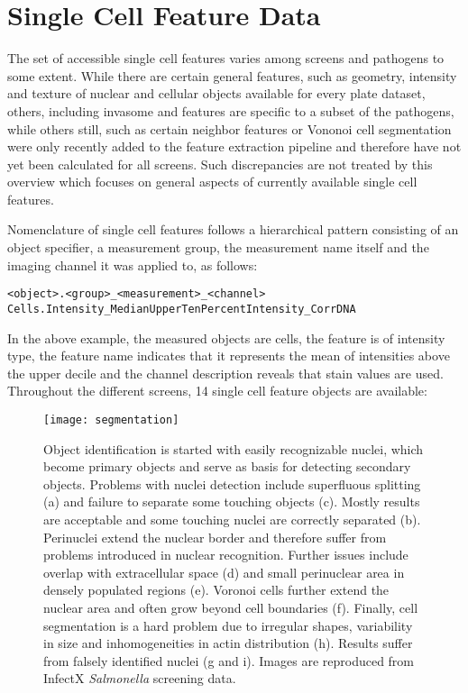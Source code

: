 \section{Single Cell Feature Data}
\label{sec:scf-data}
The set of accessible single cell features varies among screens and pathogens to some extent. While there are certain general features, such as geometry, intensity and texture of nuclear and cellular objects available for every plate dataset, others, including invasome and  features are specific to a subset of the pathogens, while others still, such as certain neighbor features or Vononoi cell segmentation were only recently added to the feature extraction pipeline and therefore have not yet been calculated for all screens. Such discrepancies are not treated by this overview which focuses on general aspects of currently available single cell features.

Nomenclature of single cell features follows a hierarchical pattern consisting of an object specifier, a measurement group, the measurement name itself and the imaging channel it was applied to, as follows:
\begin{center}
\texttt{<object>.<group>\_<measurement>\_<channel>}
\texttt{Cells.Intensity\_MedianUpperTenPercentIntensity\_CorrDNA}
\end{center}
In the above example, the measured objects are cells, the feature is of intensity type, the feature name indicates that it represents the mean of intensities above the upper decile and the channel description reveals that  stain values are used. Throughout the different screens, 14 single cell feature objects are available:

\begin{figure}
  \centering
  \texttt{[image: segmentation]}
  \caption[Object detection of Nuclei, PeriNuclei, VoronoiCells and Cells along with potential pitfalls.]{Object identification is started with easily recognizable nuclei, which become primary objects and serve as basis for detecting secondary objects. Problems with nuclei detection include superfluous splitting (a) and failure to separate some touching objects (c). Mostly results are acceptable and some touching nuclei are correctly separated (b). Perinuclei extend the nuclear border and therefore suffer from problems introduced in nuclear recognition. Further issues include overlap with extracellular space (d) and small perinuclear area in densely populated regions (e). Voronoi cells further extend the nuclear area and often grow beyond cell boundaries (f). Finally, cell segmentation is a hard problem due to irregular shapes, variability in size and inhomogeneities in actin distribution (h). Results suffer from falsely identified nuclei (g and i). Images are reproduced from InfectX \textit{Salmonella} screening data.}
  \label{fig:segmentation}
\end{figure}

